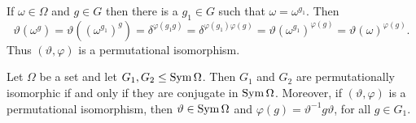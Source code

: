 \begin{sketch}
	If $\omega \in \Omega $ and $g \in G $ then there is a $g_1 \in G $ such that $\omega = \omega^{g_1}$. Then
	\begin{equation*}
		\vartheta(\omega^g) = \vartheta((\omega^{g_1} )^g) = \delta^{\varphi(g_1g)} = \delta^{\varphi(g_1)\varphi(g)} = \vartheta(\omega^{g_1} )^{\varphi(g)} = \vartheta(\omega)^{\varphi(g)}.
	\end{equation*}
	Thus $(\vartheta, \varphi)$ is a permutational isomorphism.
\end{sketch}

\begin{comment}
	\begin{proposition}
		Let $\Omega$ be a set and let $G_1, G_2 \le \Sym\Omega$. Then $G_1$ and $G_2$ are permutationally isomorphic if and only if $G_1$ and $G_2$ are conjugate subgroups of $\Sym\Omega$. Moreover, if $(\gamma, \alpha)$ is a permutational isomorphism, then $\gamma \in \Sym\Omega$ and $g\alpha = \gamma^{-1}g\gamma$, for all $g \in G_1$.
	\end{proposition}
	
	\begin{sketch}
		Assume first that $G_1$ and $G_2$ are permutationally isomorphic, and let $(\gamma, \alpha)$ be a permutational isomorphism. Then, for all $g \in G_1$ and $\omega \in \Omega$, we have $(\omega g)\gamma = (\omega\gamma)(g\alpha)$; that is $\omega g = (\omega\gamma)(g\alpha)\gamma^{-1}$. This shows that $\gamma^{-1}g\gamma = g\alpha$, and so $G_1$ is conjugate to $G_1\alpha = G_2$.
		
		Suppose conversely that $\gamma \in \Sym\Omega$ such that $\gamma^{-1}G_1\gamma = G_2$ and let $\alpha: G_1 \to G_2$ denote the isomorphism induced by conjugating by $\gamma$; that is, for $g \in G_1$, we define $g\alpha = \gamma^{-1}g\gamma$. Then, for $g \in G$ and $\omega \in \Omega$, $(\omega\gamma)(g\alpha) = \omega\gamma\gamma^{-1}g\gamma = \omega g\gamma$. Hence $(\gamma, \alpha)$ is a permutational isomorphism.
	\end{sketch}
\end{comment}


\begin{proposition}
	Let $\Omega$ be a set and let $G_1, G_2 \le \operatorname{Sym}\Omega$. Then $G_1$ and $G_2$ are permutationally isomorphic if and only if they are conjugate in $\operatorname{Sym}\Omega$. Moreover, if $(\vartheta, \varphi)$ is a permutational isomorphism, then $\vartheta \in \operatorname{Sym}\Omega$ and $\varphi(g) = \vartheta^{-1}g\vartheta$, for all $g \in G_1$.
\end{proposition}

